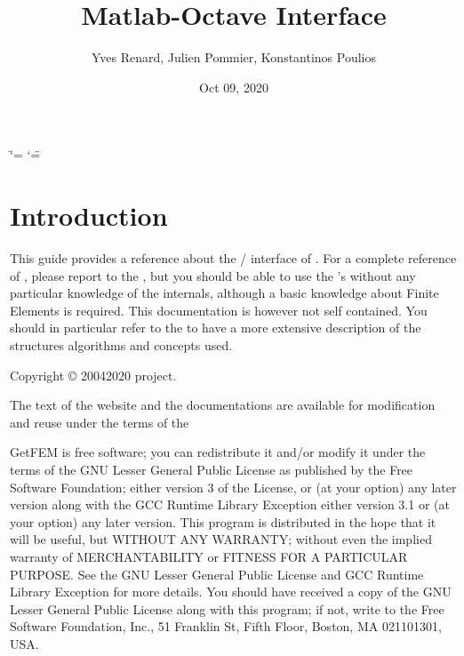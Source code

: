 \documentclass[a4paper,11pt,english]{sphinxmanual}
\title{Matlab-Octave Interface}
\date{Oct 09, 2020}
\author{Yves Renard, Julien Pommier, Konstantinos Poulios}
\begin{document}
\ifdefined\shorthandoff
  \ifnum\catcode`\=\string=\active\shorthandoff{=}\fi
  \ifnum\catcode`\"=\active{}\fi
\fi

\pagestyle{empty}
\sphinxmaketitle
\pagestyle{plain}
\sphinxtableofcontents
\pagestyle{normal}
\label{\detokenize{matlab_octave/index::doc}}



\chapter{Introduction}
\label{\detokenize{matlab_octave/intro:introduction}}\label{\detokenize{matlab_octave/intro:mlab-intro}}\label{\detokenize{matlab_octave/intro::doc}}
This guide provides a reference about the / interface of .
For a complete  reference of , please report to the ,
but you should be able to use the ’s without any particular knowledge
of the  internals, although a basic knowledge about Finite Elements
is required. This documentation is however not self contained. You should in
particular refer to the  to have a more extensive
description of the structures algorithms and concepts used.

Copyright © 2004\sphinxhyphen{}2020  project.

The text of the  website and the documentations are available for modification and reuse under the terms of the 

GetFEM  is  free software;  you  can  redistribute  it  and/or modify it
under  the  terms  of the  GNU  Lesser General Public License as published
by  the  Free Software Foundation;  either version 3 of the License,  or
(at your option) any later version along with the GCC Runtime Library
Exception either version 3.1 or (at your option) any later version.
This program  is  distributed  in  the  hope  that it will be useful,  but
WITHOUT ANY WARRANTY; without even the implied warranty of MERCHANTABILITY
or  FITNESS  FOR  A PARTICULAR PURPOSE.  See the GNU Lesser General Public
License and GCC Runtime Library Exception for more details.
You  should  have received a copy of the GNU Lesser General Public License
along  with  this program;  if not, write to the Free Software Foundation,
Inc., 51 Franklin St, Fifth Floor, Boston, MA  02110\sphinxhyphen{}1301, USA.
\end{document}
